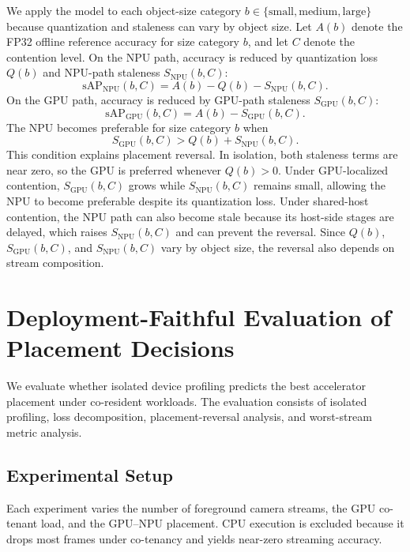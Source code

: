 \documentclass[runningheads]{llncs}
\begin{document}
We apply the model to each object-size category $b \in \{\mathrm{small}, \mathrm{medium}, \mathrm{large}\}$ because quantization and staleness can vary by object size. Let $A(b)$ denote the FP32 offline reference accuracy for size category $b$, and let $C$ denote the contention level. On the NPU path, accuracy is reduced by quantization loss $Q(b)$ and NPU-path staleness $S_{\mathrm{NPU}}(b,C)$:
\begin{equation}
\mathrm{sAP}_{\mathrm{NPU}}(b,C) = A(b)-Q(b)-S_{\mathrm{NPU}}(b,C).
\label{eq:npu}
\end{equation}
%
On the GPU path, accuracy is reduced by GPU-path staleness $S_{\mathrm{GPU}}(b,C)$:
\begin{equation}
\mathrm{sAP}_{\mathrm{GPU}}(b,C) = A(b)-S_{\mathrm{GPU}}(b,C).
\label{eq:gpu}
\end{equation}
%
The NPU becomes preferable for size category $b$ when
\begin{equation}
S_{\mathrm{GPU}}(b,C) > Q(b)+S_{\mathrm{NPU}}(b,C).
\label{eq:crossover}
\end{equation}
%
This condition explains placement reversal. In isolation, both staleness terms are near zero, so the GPU is preferred whenever $Q(b)>0$. Under GPU-localized contention, $S_{\mathrm{GPU}}(b,C)$ grows while $S_{\mathrm{NPU}}(b,C)$ remains small, allowing the NPU to become preferable despite its quantization loss. Under shared-host contention, the NPU path can also become stale because its host-side stages are delayed, which raises $S_{\mathrm{NPU}}(b,C)$ and can prevent the reversal. Since $Q(b)$, $S_{\mathrm{GPU}}(b,C)$, and $S_{\mathrm{NPU}}(b,C)$ vary by object size, the reversal also depends on stream composition.


\section{Deployment-Faithful Evaluation of Placement Decisions}

We evaluate whether isolated device profiling predicts the best accelerator placement under co-resident workloads. The evaluation consists of isolated profiling, loss decomposition, placement-reversal analysis, and worst-stream metric analysis.

\subsection{Experimental Setup}
\label{sec:setup}

Each experiment varies the number of foreground camera streams, the GPU co-tenant load, and the GPU--NPU placement. CPU execution is excluded because it drops most frames under co-tenancy and yields near-zero streaming accuracy.
\end{document}
